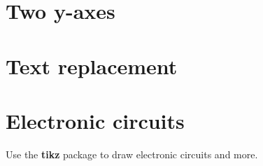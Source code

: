 

\chapter{Two y-axes}



\chapter{Text replacement}



\chapter{Electronic circuits}

Use the \textbf{tikz} package to draw electronic circuits and more.



\newpage

\setcounter{page}{\value{romanpagenumbers}}

\printbibliography
  
